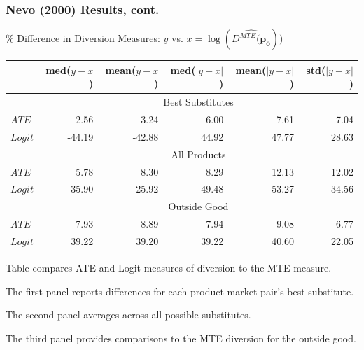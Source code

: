 \documentclass[xcolor=pdftex,dvipsnames,table,mathserif,aspectratio=169]{beamer}
\begin{document}
\begin{frame}
\frametitle{Nevo (2000) Results, cont.}

\% Difference in Diversion Measures: $y$ vs. $x=\log(\widehat{D^{MTE}(\mathbf{p_0}}))$
\begin{center}
\footnotesize
\begin{tabular}{l  rrrrr}
{} &  med($y-x$) &  mean($y-x$) &  med($|y-x|$) &  mean($|y-x|$) &  std($|y-x|$) \\ \hline
& \multicolumn{5}{c}{Best Substitutes}\\  \hline
$ATE$   &        2.56 &         3.24 &          6.00 &           7.61 &          7.04 \\
$Logit$ &      -44.19 &       -42.88 &         44.92 &          47.77 &         28.63 \\  \hline
& \multicolumn{5}{c}{All Products}\\  \hline
$ATE$   &        5.78 &         8.30 &          8.29 &          12.13 &         12.02 \\
$Logit$ &      -35.90 &       -25.92 &         49.48 &          53.27 &         34.56 \\  \hline
& \multicolumn{5}{c}{Outside Good}\\  \hline
$ATE$   &       -7.93 &        -8.89 &          7.94 &           9.08 &          6.77 \\
$Logit$ &       39.22 &        39.20 &         39.22 &          40.60 &         22.05 \\  \hline
\end{tabular}
\end{center}

Table compares ATE and Logit measures of diversion to the MTE measure.

The first panel reports differences for each product-market pair's best substitute. 

The second panel averages across all possible substitutes. 

The third panel provides comparisons to the MTE diversion for the outside good.

\end{frame}
\end{document}
